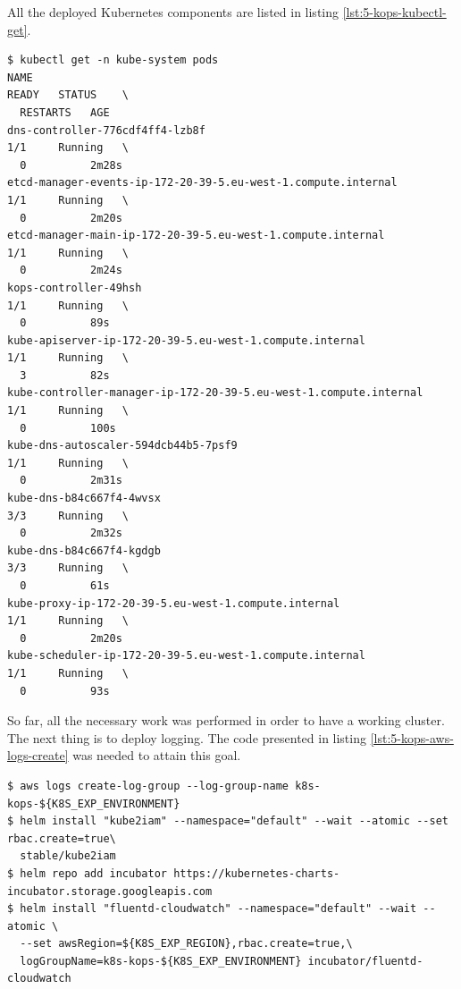 All the deployed Kubernetes components are listed in listing \ref{lst:5-kops-kubectl-get}.
\begin{lstlisting}[basicstyle=\scriptsize,xleftmargin=0cm,label=lst:5-kops-kubectl-get,caption={Kubernetes components in a \textit{kops} cluster}]
$ kubectl get -n kube-system pods
NAME                                                                READY   STATUS    \
  RESTARTS   AGE
dns-controller-776cdf4ff4-lzb8f                                     1/1     Running   \
  0          2m28s
etcd-manager-events-ip-172-20-39-5.eu-west-1.compute.internal       1/1     Running   \
  0          2m20s
etcd-manager-main-ip-172-20-39-5.eu-west-1.compute.internal         1/1     Running   \
  0          2m24s
kops-controller-49hsh                                               1/1     Running   \
  0          89s
kube-apiserver-ip-172-20-39-5.eu-west-1.compute.internal            1/1     Running   \
  3          82s
kube-controller-manager-ip-172-20-39-5.eu-west-1.compute.internal   1/1     Running   \
  0          100s
kube-dns-autoscaler-594dcb44b5-7psf9                                1/1     Running   \
  0          2m31s
kube-dns-b84c667f4-4wvsx                                            3/3     Running   \
  0          2m32s
kube-dns-b84c667f4-kgdgb                                            3/3     Running   \
  0          61s
kube-proxy-ip-172-20-39-5.eu-west-1.compute.internal                1/1     Running   \
  0          2m20s
kube-scheduler-ip-172-20-39-5.eu-west-1.compute.internal            1/1     Running   \
  0          93s
\end{lstlisting}

So far, all the necessary work was performed in order to have a working cluster. The next thing is to deploy logging. The code presented in listing \ref{lst:5-kops-aws-logs-create} was needed to attain this goal.
\begin{lstlisting}[basicstyle=\scriptsize,xleftmargin=0cm,label=lst:5-kops-aws-logs-create,caption={Commands providing the logging solution}]
$ aws logs create-log-group --log-group-name k8s-kops-${K8S_EXP_ENVIRONMENT}
$ helm install "kube2iam" --namespace="default" --wait --atomic --set rbac.create=true\
  stable/kube2iam
$ helm repo add incubator https://kubernetes-charts-incubator.storage.googleapis.com
$ helm install "fluentd-cloudwatch" --namespace="default" --wait --atomic \
  --set awsRegion=${K8S_EXP_REGION},rbac.create=true,\
  logGroupName=k8s-kops-${K8S_EXP_ENVIRONMENT} incubator/fluentd-cloudwatch
\end{lstlisting}

